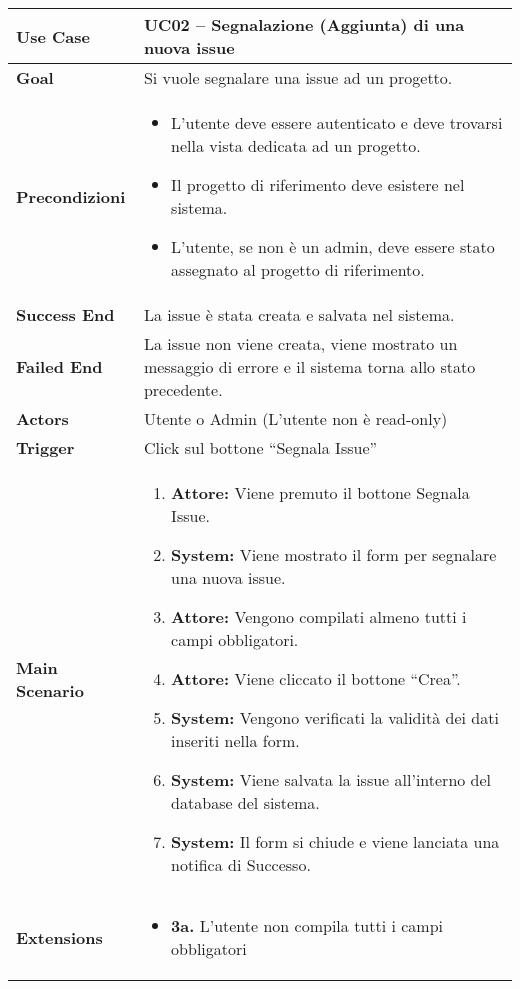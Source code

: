 \begin{table}[h]
	\centering
	\begin{tabular}{|p{3cm}|p{11cm}|}
		\hline
		\textbf{Use Case} & UC02 -- Segnalazione (Aggiunta) di una nuova issue \\
		\hline
		\textbf{Goal} & Si vuole segnalare una issue ad un progetto. \\
		\hline
		\textbf{Precondizioni} & 
		\begin{itemize}
			\item L'utente deve essere autenticato e deve trovarsi nella vista dedicata ad un progetto.
			\item Il progetto di riferimento deve esistere nel sistema.
			\item L'utente, se non è un admin, deve essere stato assegnato al progetto di riferimento.
		\end{itemize} \\
		\hline
		\textbf{Success End} & La issue è stata creata e salvata nel sistema. \\
		\hline
		\textbf{Failed End} & La issue non viene creata, viene mostrato un messaggio di errore e il sistema torna allo stato precedente. \\
		\hline
		\textbf{Actors} & Utente o Admin (L'utente non è read-only) \\
		\hline
		\textbf{Trigger} & Click sul bottone ``Segnala Issue'' \\
		\hline
		\textbf{Main Scenario} & 
		\begin{enumerate}
			\item \textbf{Attore:} Viene premuto il bottone Segnala Issue.
			\item \textbf{System:} Viene mostrato il form per segnalare una nuova issue.
			\item \textbf{Attore:} Vengono compilati almeno tutti i campi obbligatori.
			\item \textbf{Attore:} Viene cliccato il bottone ``Crea''.
			\item \textbf{System:} Vengono verificati la validità dei dati inseriti nella form.
			\item \textbf{System:} Viene salvata la issue all'interno del database del sistema.
			\item \textbf{System:} Il form si chiude e viene lanciata una notifica di Successo.
		\end{enumerate} \\
		\hline
		\textbf{Extensions} & 
		\begin{itemize}
			\item \textbf{3a.} L'utente non compila tutti i campi obbligatori

\end{itemize}
\end{tabular}
\end{table}
